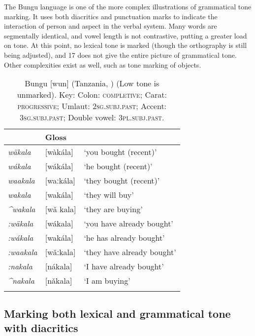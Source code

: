 \documentclass[output=paper]{langscibook}
\begin{document}
The Bungu language is one of the more complex illustrations of grammatical tone marking. It uses both diacritics and punctuation marks to indicate the interaction of person and aspect in the verbal system. Many words are segmentally identical, and vowel length is not contrastive, putting a greater load on tone. At this point, no lexical tone is marked (though the orthography is still being adjusted), and 17 does not give the entire picture of grammatical tone. Other complexities exist as well, such as tone marking of objects. 

\begin{table}
        \begin{tabular}{lll}
        \lsptoprule
\multicolumn{2}{l}{Orthography} & Gloss\\\midrule
        {\textit{w\"{a}kala}}  & [wàkála] & ‘you bought (recent)’            \\
        {\textit{wákala}}  & [wákála] & ‘he bought (recent)’                 \\
        {\textit{waakala}}  & [waːkála] & ‘they bought (recent)’             \\
        {\textit{wakala}}   & [wakála]   & ‘they will buy’           \\
        {\textit{\^{}wakala}}  & [wa\v{} kala]   & ‘they are buying’ \\
        {\textit{:w\"{a}kala}} & [wákala] & {‘you have already bought’}\\
        {\textit{:wákala}}  & [wakála]  & {‘he has already bought’}\\
        {\textit{:waakala}}  & [wǎːkala] & {‘they have already bought’}\\
        {\textit{:nakala}}  & [nákala] & {‘I have already bought’}\\
        {\textit{\^{}nakala} } & [nǎkala]  & {‘I am buying’}\\
\lspbottomrule
        \end{tabular}
        \caption{Bungu [wun] (Tanzania, \citealt{Katterhenrich2016}) \textmd{(Low tone is unmarked)}. Key:  Colon: \textsc{completive}; Carat: \textsc{progressive}; Umlaut: \textsc{2sg.subj.past}; Accent: \textsc{3sg.subj.past}; Double vowel: \textsc{3pl.subj.past}.}
        \label{bkm:Ref482367954}
    \end{table}

\subsection{Marking both lexical and grammatical tone with diacritics}
\label{sec:HowToneMarked:LexicalGrammatical:4}
\end{document}
